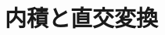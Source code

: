\documentclass[./topic_linear-algebra]{subfiles}
\begin{document}
\chapter{内積と直交変換}

\end{document}
